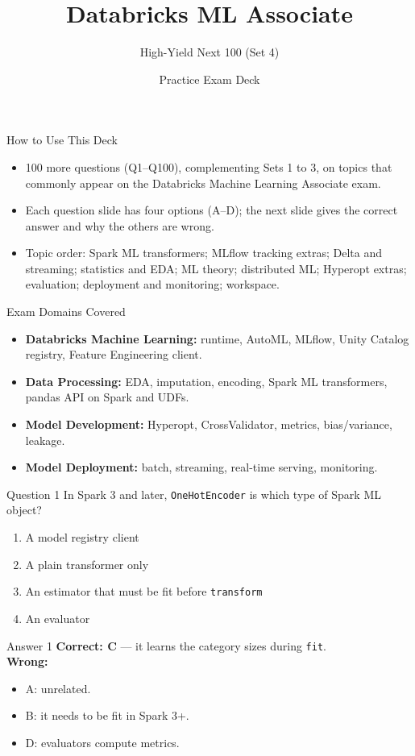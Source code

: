 \documentclass[aspectratio=169,11pt]{beamer}
\title{Databricks ML Associate}
\subtitle{High-Yield Next 100 (Set 4)}
\author{Practice Exam Deck}
\date{}
\begin{document}
\begin{frame}
\titlepage
\end{frame}

\begin{frame}{How to Use This Deck}
\begin{itemize}
\item 100 more questions (Q1--Q100), complementing Sets 1 to 3, on topics that commonly appear on the Databricks Machine Learning Associate exam.
\item Each question slide has four options (A--D); the next slide gives the correct answer and why the others are wrong.
\item Topic order: Spark ML transformers; MLflow tracking extras; Delta and streaming; statistics and EDA; ML theory; distributed ML; Hyperopt extras; evaluation; deployment and monitoring; workspace.
\end{itemize}
\end{frame}

\begin{frame}{Exam Domains Covered}
\begin{itemize}
\item \textbf{Databricks Machine Learning:} runtime, AutoML, MLflow, Unity Catalog registry, Feature Engineering client.
\item \textbf{Data Processing:} EDA, imputation, encoding, Spark ML transformers, pandas API on Spark and UDFs.
\item \textbf{Model Development:} Hyperopt, CrossValidator, metrics, bias/variance, leakage.
\item \textbf{Model Deployment:} batch, streaming, real-time serving, monitoring.
\end{itemize}
\end{frame}

\begin{frame}{Question 1}
In Spark 3 and later, \texttt{OneHotEncoder} is which type of Spark ML object?
\begin{enumerate}[label=\Alph*.]
\item A model registry client
\item A plain transformer only
\item An estimator that must be fit before \texttt{transform}
\item An evaluator
\end{enumerate}
\end{frame}
\begin{frame}{Answer 1}
\textbf{Correct: C} --- it learns the category sizes during \texttt{fit}.\\
\vspace{0.5em}
\textbf{Wrong:}
\begin{itemize}
\item A: unrelated.
\item B: it needs to be fit in Spark 3+.
\item D: evaluators compute metrics.
\end{itemize}
\end{frame}
\end{document}
